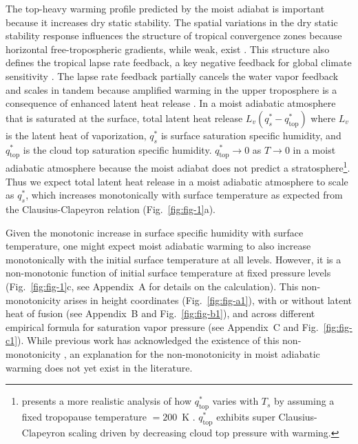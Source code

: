 \documentclass[draft]{ametsocV6.1}
\begin{document}
The top-heavy warming profile predicted by the moist adiabat is important because it increases dry static stability. The spatial variations in the dry static stability response influences the structure of tropical convergence zones because horizontal free-tropospheric gradients, while weak, exist \citep{neelin1987, bao2022}. This structure also defines the tropical lapse rate feedback, a key negative feedback for global climate sensitivity \citep{hansen1984}. The lapse rate feedback partially cancels the water vapor feedback and scales in tandem because amplified warming in the upper troposphere is a consequence of enhanced latent heat release \citep{held2012}. In a moist adiabatic atmosphere that is saturated at the surface, total latent heat release $L_v (q_s^*-q_\mathrm{top}^*)$ where $L_v$ is the latent heat of vaporization, $q_s^*$ is surface saturation specific humidity, and $q_\mathrm{top}^*$ is the cloud top saturation specific humidity. $q_\mathrm{top}^*\to0$ as $T\to0$ in a moist adiabatic atmosphere because the moist adiabat does not predict a stratosphere\footnote{\cite{romps2016} presents a more realistic analysis of how $q_\mathrm{top}^*$ varies with $T_s$ by assuming a fixed tropopause temperature $= 200$~K \citep[see ][for evidence supporting this assumption]{hartmann2002, seeley2019}. $q_\mathrm{top}^*$ exhibits super Clausius-Clapeyron scaling driven by decreasing cloud top pressure with warming.}. Thus we expect total latent heat release in a moist adiabatic atmosphere to scale as $q_s^*$, which increases monotonically with surface temperature as expected from the Clausius-Clapeyron relation (Fig.~\ref{fig:fig-1}a).

Given the monotonic increase in surface specific humidity with surface temperature, one might expect moist adiabatic warming to also increase monotonically with the initial surface temperature at all levels. However, it is a non-monotonic function of initial surface temperature at fixed pressure levels (Fig.~\ref{fig:fig-1}c, see Appendix~A for details on the calculation). This non-monotonicity arises in height coordinates (Fig.~\ref{fig:fig-a1}), with or without latent heat of fusion (see Appendix~B and Fig.~\ref{fig:fig-b1}), and across different empirical formula for saturation vapor pressure (see Appendix~C and Fig.~\ref{fig:fig-c1}). While previous work has acknowledged the existence of this non-monotonicity \citep{byrne2013, levine2016}, an explanation for the non-monotonicity in moist adiabatic warming does not yet exist in the literature.
\end{document}
